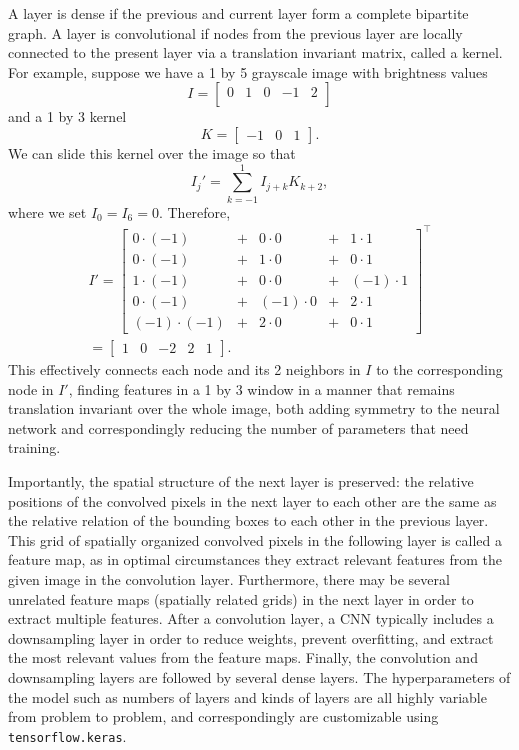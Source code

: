 \documentclass{article}
\begin{document}
A layer is dense if the previous and current layer form a complete bipartite graph. A layer is convolutional if nodes from the previous layer are locally connected to the present layer via a translation invariant matrix, called a kernel. For example, suppose we have a 1 by 5 grayscale image with brightness values
\[I=\begin{bmatrix}
    0 & 1 & 0 & -1 & 2 \\
\end{bmatrix}\]
and a 1 by 3 kernel
\[K=\begin{bmatrix}
    -1 & 0 & 1
\end{bmatrix}.\]
We can slide this kernel over the image so that
\[I_j'=\sum_{k=-1}^1 I_{j+k}K_{k+2},\]
where we set $I_0=I_6=0$. Therefore,
\begin{gather*}
    I'=\begin{bmatrix}
        0\cdot (-1) & + & 0 \cdot 0 & + & 1 \cdot 1 \\
        0 \cdot (-1) & + & 1 \cdot 0 & + & 0 \cdot 1 \\
        1 \cdot (-1) & + & 0 \cdot 0 & + & (-1) \cdot 1 \\
        0 \cdot (-1) & + & (-1) \cdot 0 & + & 2 \cdot 1 \\
        (-1) \cdot (-1) & + & 2 \cdot 0 & + & 0 \cdot 1
    \end{bmatrix}^\intercal \\
    =\begin{bmatrix}
        1 & 0 & -2 & 2 & 1
    \end{bmatrix}.
\end{gather*}
This effectively connects each node and its 2 neighbors in $I$ to the corresponding node in $I'$, finding features in a 1 by 3 window in a manner that remains translation invariant over the whole image, both adding symmetry to the neural network and correspondingly reducing the number of parameters that need training.

Importantly, the spatial structure of the next layer is preserved: the relative positions of the convolved pixels in the next layer to each other are the same as the relative relation of the bounding boxes to each other in the previous layer. This grid of spatially organized convolved pixels in the following layer is called a feature map, as in optimal circumstances they extract relevant features from the given image in the convolution layer. Furthermore, there may be several unrelated feature maps (spatially related grids) in the next layer in order to extract multiple features. After a convolution layer, a CNN typically includes a downsampling layer in order to reduce weights, prevent overfitting, and extract the most relevant values from the feature maps. Finally, the convolution and downsampling layers are followed by several dense layers. The hyperparameters of the model such as numbers of layers and kinds of layers are all highly variable from problem to problem, and correspondingly are customizable using \verb|tensorflow.keras|.
\end{document}

